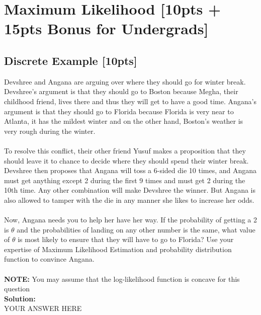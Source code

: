 \documentclass{article}
\begin{document}
\section{Maximum Likelihood [10pts + 15pts Bonus for Undergrads]}
\subsection{Discrete Example [10pts]}
Devshree and Angana are arguing over where they should go for winter break. Devshree’s argument is that they should go to Boston because Megha, their childhood friend, lives there and thus they will get to have a good time. Angana’s argument is that they should go to Florida because Florida is very near to Atlanta, it has the mildest winter and on the other hand, Boston’s weather is very rough during the winter.\\\\To resolve this conflict, their other friend Yusuf makes a proposition that they should leave it to chance to decide where they should spend their winter break. Devshree then proposes that Angana will toss a 6-sided die 10 times, and Angana must get anything except 2 during the first 9 times and must get 2 during the 10th time. Any other combination will make Devshree the winner. But Angana is also allowed to tamper with the die in any manner she likes to increase her odds.\\\\Now, Angana needs you to help her have her way. If the probability of getting a 2 is $\theta$ and the probabilities of landing on any other number is the same, what value of $\theta$ is most likely to ensure that they will have to go to Florida? Use your expertise of Maximum Likelihood Estimation and probability distribution function to convince Angana.\\\\\textbf{NOTE: }You may assume that the log-likelihood function is concave for this question\bigskip \\
\textbf{Solution:}\\
YOUR ANSWER HERE
\newpage
\end{document}
